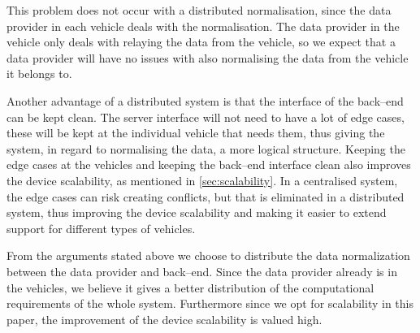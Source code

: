 This problem does not occur with a distributed normalisation, since the data provider in each vehicle deals with the normalisation.
The data provider in the vehicle only deals with relaying the data from the vehicle,
so we expect that a data provider will have no issues with also normalising the data from the vehicle it belongs to.

Another advantage of a distributed system is that the interface of the back--end can be kept clean.
The server interface will not need to have a lot of edge cases,
these will be kept at the individual vehicle that needs them,
thus giving the system, in regard to normalising the data, a more logical structure.
Keeping the edge cases at the vehicles and keeping the back--end interface clean also improves the device scalability,
as mentioned in \cref{sec:scalability}.
In a centralised system, the edge cases can risk creating conflicts, but that is eliminated in a distributed system,
thus improving the device scalability and making it easier to extend support for different types of vehicles.

\bigskip
From the arguments stated above we choose to distribute the data normalization between the data provider and back--end.
Since the data provider already is in the vehicles,
we believe it gives a better distribution of the computational requirements of the whole system.
Furthermore since we opt for scalability in this paper, the improvement of the device scalability is valued high.
